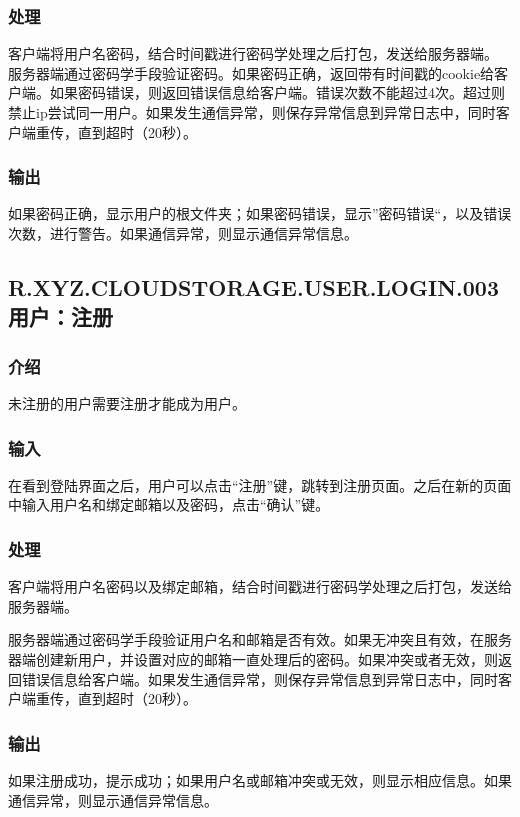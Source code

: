 \subsubsection{处理}
客户端将用户名密码，结合时间戳进行密码学处理之后打包，发送给服务器端。
服务器端通过密码学手段验证密码。如果密码正确，返回带有时间戳的cookie给客户端。如果密码错误，则返回错误信息给客户端。错误次数不能超过4次。超过则禁止ip尝试同一用户。如果发生通信异常，则保存异常信息到异常日志中，同时客户端重传，直到超时（20秒）。

\subsubsection{输出}
如果密码正确，显示用户的根文件夹；如果密码错误，显示”密码错误“，以及错误次数，进行警告。如果通信异常，则显示通信异常信息。

\subsection{R.XYZ.CLOUDSTORAGE.USER.LOGIN.003 用户：注册 }

\subsubsection{介绍}
未注册的用户需要注册才能成为用户。

\subsubsection{输入}
在看到登陆界面之后，用户可以点击“注册”键，跳转到注册页面。之后在新的页面中输入用户名和绑定邮箱以及密码，点击“确认”键。

\subsubsection{处理}
客户端将用户名密码以及绑定邮箱，结合时间戳进行密码学处理之后打包，发送给服务器端。

服务器端通过密码学手段验证用户名和邮箱是否有效。如果无冲突且有效，在服务器端创建新用户，并设置对应的邮箱一直处理后的密码。如果冲突或者无效，则返回错误信息给客户端。如果发生通信异常，则保存异常信息到异常日志中，同时客户端重传，直到超时（20秒）。

\subsubsection{输出}
如果注册成功，提示成功；如果用户名或邮箱冲突或无效，则显示相应信息。如果通信异常，则显示通信异常信息。

